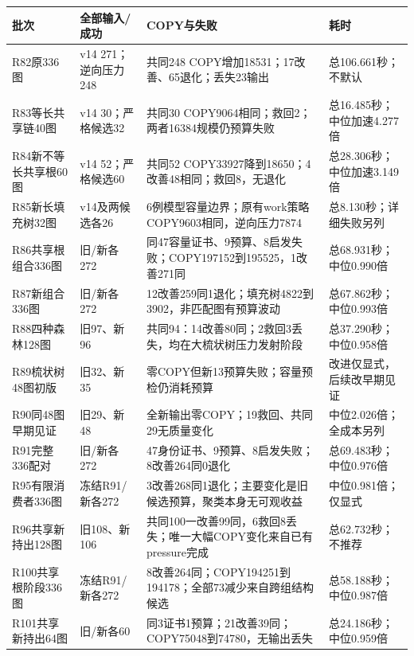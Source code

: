 \documentclass[UTF8,11pt,a4paper]{ctexart}
\begin{document}
\begin{longtable}{p{25mm}p{41mm}p{51mm}p{34mm}}
\toprule
批次 & 全部输入/成功 & COPY与失败 & 耗时 \\
\midrule
R82原336图 & v14 271；逆向压力248 & 共同248 COPY增加18531；17改善、65退化；丢失23输出 & 总106.661秒；不默认 \\
R83等长共享链40图 & v14 30；严格候选32 & 共同30 COPY9064相同；救回2；两者16384规模仍预算失败 & 总16.485秒；中位加速4.277倍 \\
R84新不等长共享根60图 & v14 52；严格候选60 & 共同52 COPY33927降到18650；4改善48相同；救回8，无退化 & 总28.306秒；中位加速3.149倍 \\
R85新长填充树32图 & v14及两候选各26 & 6例模型容量边界；原有work策略COPY9603相同，逆向压力7874 & 总8.130秒；详细失败另列 \\
R86共享根组合336图 & 旧/新各272 & 同47容量证书、9预算、8启发失败；COPY197152到195525，1改善271同 & 总68.931秒；中位0.990倍 \\
R87新组合336图 & 旧/新各272 & 12改善259同1退化；填充树4822到3902，非匹配图有预算波动 & 总67.862秒；中位0.993倍 \\
R88四种森林128图 & 旧97、新96 & 共同94：14改善80同；2救回3丢失，均在大梳状树压力发射阶段 & 总37.290秒；中位0.958倍 \\
R89梳状树48图初版 & 旧32、新35 & 零COPY但新13预算失败；容量预检仍消耗预算 & 改进仅显式，后续改早期见证 \\
R90同48图早期见证 & 旧29、新48 & 全新输出零COPY；19救回、共同29无质量变化 & 中位2.026倍；全成本另列 \\
R91完整336配对 & 旧/新各272 & 47身份证书、9预算、8启发失败；8改善264同0退化 & 总69.483秒；中位0.976倍 \\
R95有限消费者336图 & 冻结R91/新各272 & 3改善268同1退化；主要变化是旧候选预算，聚类本身无可观收益 & 中位0.981倍；仅显式 \\
R96共享新持出128图 & 旧108、新106 & 共同100一改善99同，6救回8丢失；唯一大幅COPY变化来自已有pressure完成 & 总62.732秒；不推荐 \\
R100共享根阶段336图 & 冻结R91/新各272 & 8改善264同；COPY194251到194178；全部73减少来自跨组结构候选 & 总58.188秒；中位0.987倍 \\
R101共享新持出64图 & 旧/新各60 & 同3证书1预算；21改善39同；COPY75048到74780，无输出丢失 & 总24.186秒；中位0.959倍 \\
\bottomrule
\end{longtable}
\end{document}
